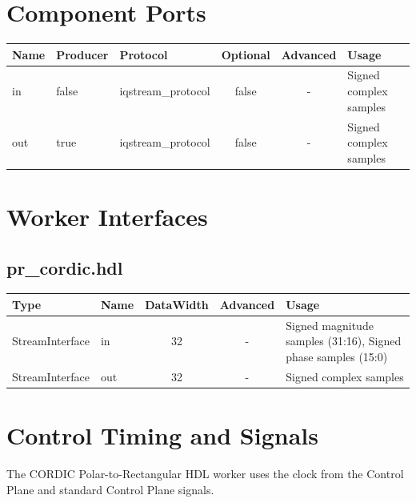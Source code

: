 \documentclass{article}
\def\comp{pr\_cordic}
\begin{document}
\begin{landscape}
	\section*{Component Ports}
	\begin{scriptsize}
		\begin{tabular}{|M{2cm}|M{1.5cm}|M{4cm}|c|c|M{9cm}|}
			\hline
			Name & Producer & Protocol           & Optional & Advanced & Usage                  \\
			\hline
			in   & false    & iqstream\_protocol & false    & -        & Signed complex samples \\
			\hline
			out  & true     & iqstream\_protocol & false    & -        & Signed complex samples \\
			\hline
		\end{tabular}
	\end{scriptsize}

	\section*{Worker Interfaces}
	\subsection*{\comp.hdl}
	\begin{scriptsize}
		\begin{tabular}{|M{2cm}|M{1.5cm}|c|c|M{12cm}|}
			\hline
			\rowcolor{blue}
			Type            & Name & DataWidth & Advanced & Usage                  \\
			\hline
			StreamInterface & in   & 32        & -        & Signed magnitude samples (31:16), Signed phase samples (15:0) \\
			\hline
			StreamInterface & out  & 32        & -        & Signed complex samples \\
			\hline
		\end{tabular}
	\end{scriptsize}
\end{landscape}

\section*{Control Timing and Signals}
\begin{flushleft}
	The CORDIC Polar-to-Rectangular HDL worker uses the clock from the Control Plane and standard Control Plane signals.
\end{flushleft}
\end{document}
